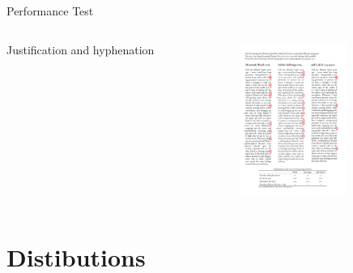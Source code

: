 \documentclass{beamer}
\begin{document}
\begin{frame} {Performance Test \cite{The_Beauty_of_LATEX}}
     \begin{columns}[t]
     \begin{column}[T]{5cm}
      Justification and hyphenation 
     \end{column}
     \begin{column}[T]{5cm} %
      \includegraphics[height=5cm,trim = 0mm 0mm 00mm 0mm]{../figs/comparison.pdf}\\
     \end{column}
     \end{columns} 
\end{frame}


\section{Distibutions}
\end{document}
